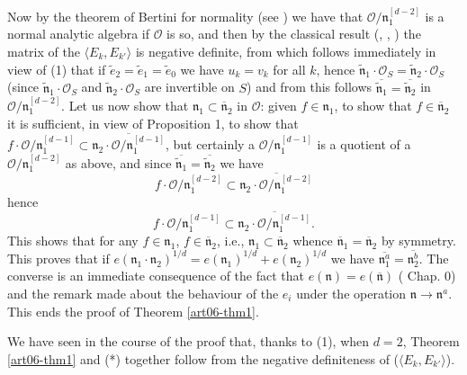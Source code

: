 Now by the theorem of Bertini for normality (see \cite{art06-keyF}) we have that $\mathcal{O}/\mathfrak{n}^{[d-2]}_1$ is a normal analytic algebra if $\mathcal{O}$ is so, and then by the classical result (\cite{art06-keyDV}, \cite{art06-keyLi}, \cite{art06-keyM}) the matrix of the $\langle E_k, E_{k'}\rangle $ is negative definite, from which follows immediately in view of (1) that if $\tilde{e}_2 = \tilde{e}_1 =\tilde{e}_0$ we have $u_k = v_k$ for all $k$, hence $\tilde{\mathfrak{n}}_1 \cdot \mathcal{O}_S = \tilde{\mathfrak{n}}_2 \cdot \mathcal{O}_S$ (since $\tilde{\mathfrak{n}}_1 \cdot \mathcal{O}_S$ and $\tilde{\mathfrak{n}}_2 \cdot \mathcal{O}_S$ are invertible on $S$) and from this follows $\overline{\tilde{\mathfrak{n}}_1} = \overline{\tilde{\mathfrak{n}}_2}$ in $\mathcal{O}/\mathfrak{n}^{[d-2]}_1$. Let us now show that $\mathfrak{n}_1 \subset \overline{\mathfrak{n}}_2$ in $\mathcal{O}$: given $f \in \mathfrak{n}_1$, to show that $f \in \overline{\mathfrak{n}}_2$ it is sufficient, in view  of Proposition 1, to show that $f \cdot \mathcal{O} / \mathfrak{n}^{[d-1]}_1\subset \overline{\mathfrak{n}_2\cdot \mathcal{O}/\mathfrak{n}_1^{[d-1]}}$, but certainly a $\mathcal{O}/\mathfrak{n}_1^{[d-1]}$ is a quotient of a $\mathcal{O}/\mathfrak{n}_1^{[d-2]}$ as above, and since $\overline{\tilde{\mathfrak{n}}_1} = \overline{\tilde{\mathfrak{n}}_2}$ we have 
$$
f \cdot \mathcal{O} / \mathfrak{n}^{[d-2]}_1  \subset \overline{\mathfrak{n}_2 \cdot \mathcal{O} / \mathfrak{n}^{[d-2]}_1}
$$
hence
$$
f \cdot \mathcal{O} / \mathfrak{n}^{[d-1]}_1 \subset \overline{\mathfrak{n}_2 \cdot \mathcal{O}/ \mathfrak{n}^{[d-1]}_1}. 
$$
This shows that for any $f \in \mathfrak{n}_1$, $f \in \overline{\mathfrak{n}}_2$, i.e., $\mathfrak{n}_1 \subset \overline{\mathfrak{n}}_2$ whence $\overline{\mathfrak{n}}_1 = \overline{\mathfrak{n}}_2$ by symmetry. This proves that if $e(\mathfrak{n}_1 \cdot \mathfrak{n}_2)^{1/d} = e(\mathfrak{n}_1)^{1/d} + e(\mathfrak{n}_2)^{1/d}$  we have $\overline{\mathfrak{n}^a_1} = \overline{\mathfrak{n}^b_2}$. The converse is an immediate consequence of the fact that $e(\mathfrak{n}) = e(\overline{\mathfrak{n}})$ (\cite{art06-keyC.E.W.} Chap. 0) and the remark made about the behaviour of the $e_i$ under the operation $\mathfrak{n} \to \mathfrak{n}^a$. This ends the proof of Theorem \ref{art06-thm1}.

\begin{remark*}
We have seen in the course of the proof that, thanks to (1), when $d =2$, Theorem \ref{art06-thm1} and (*) together follow from the negative definiteness of ($\langle E_k, E_{k'}\rangle $).
\end{remark*}


